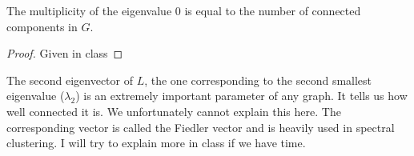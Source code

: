 \documentclass{article}
\begin{document}
\begin{fact}
The multiplicity of the eigenvalue $0$ is equal to the number of connected components in $G$.
\end{fact}
\begin{proof}
Given in class
\end{proof}

The second eigenvector of $L$, the one corresponding to the second smallest eigenvalue ($\lambda_2$) is an
extremely important parameter of any graph. It tells us how well connected it is. We unfortunately cannot explain this here.
The corresponding vector is called the Fiedler vector and is heavily used in spectral clustering.
I will try to explain more in class if we have time.




\end{document}
